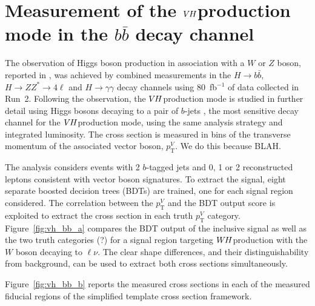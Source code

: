 \documentclass{moriond}
\def\wh{\texorpdfstring{\ensuremath{W\kern -0.1em H}\xspace}{WH\xspace}}
\def\vh{\texorpdfstring{\ensuremath{V\kern -0.1em H}\xspace}{VH\xspace}}
\begin{document}
\section{Measurement of the \vh production mode in the $b\bar b$ decay channel}\label{sec:vh_bb}

The observation of Higgs boson production in association with a $W$ or $Z$ boson, reported in
\cite{HIGG-2018-04}, was achieved by combined measurements in the $H{\rightarrow}b\bar b$,
$H{\rightarrow}ZZ^*{\rightarrow}4\ell$ and $H{\rightarrow}\gamma\gamma$ decay channels using
80~fb$^{-1}$ of data collected in Run~2.
Following the observation, the \vh production mode is studied in further detail using Higgs bosons
decaying to a pair of $b$-jets \cite{Aaboud:2019nan}, the most sensitive decay channel for the \vh production mode,
using the same analysis strategy and integrated luminosity.
The cross section is measured in bins of the transverse momentum of the associated vector boson,
$p^{V}_\mathrm{T}$. We do this because BLAH.

The analysis considers events with 2 $b$-tagged jets and 0, 1 or 2 reconstructed leptons consistent
with vector boson signatures. To extract the signal, eight separate boosted decision trees (BDTs)
are trained, one for each signal region considered.
The correlation between the $p^{V}_\mathrm{T}$ and the BDT output score is exploited
to extract the cross section in each truth $p^{V}_\mathrm{T}$ category.
Figure~\ref{fig:vh_bb_a} compares the BDT output of the inclusive signal as well as the two
truth categories (?) for a signal region targeting \wh production with the $W$ boson decaying to
$\ell\nu$. The clear shape differences, and their distinguishability from background, can be used to
extract both cross sections simultaneously.

Figure~\ref{fig:vh_bb_b} reports the measured cross sections in each of the measured fiducial regions
of the simplified template cross section framework.
\end{document}
